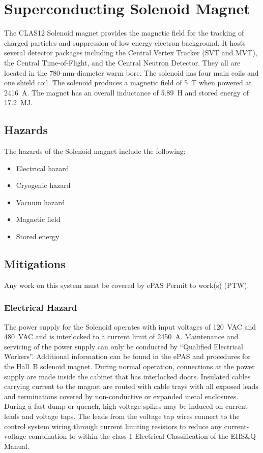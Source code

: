 \section{Superconducting Solenoid Magnet}

The CLAS12 Solenoid magnet provides the magnetic field for the tracking of charged 
particles and suppression of low energy electron background. It hosts several detector 
packages including the Central Vertex Tracker (SVT and MVT), the Central Time-of-Flight, 
and the Central Neutron Detector. They all are located in the 780-mm-diameter warm bore. 
The solenoid has four main coils and one shield coil. The solenoid produces a magnetic 
field of 5~T when powered at 2416~A. The magnet has an overall inductance of 5.89~H and 
stored energy of 17.2~MJ.

\subsection{Hazards} 

The hazards of the Solenoid magnet include the following:

\begin{itemize}
\item Electrical hazard
\item Cryogenic hazard
\item Vacuum hazard
\item Magnetic field
\item Stored energy
\end{itemize}

\subsection{Mitigations}
Any work on this system must be covered by ePAS Permit to work(s) (PTW).

\subsubsection{Electrical Hazard}

The power supply for the Solenoid operates with input voltages of 120~VAC and 480~VAC and 
is interlocked to a current limit of 2450~A. Maintenance and servicing of the power supply 
can only be conducted by ``Qualified Electrical Workers''. Additional information can be 
found in the ePAS and procedures for the Hall~B solenoid magnet. During normal operation, connections at 
the power supply are made inside the cabinet that has interlocked doors. Insulated cables 
carrying current to the magnet are routed with cable trays with all exposed leads and 
terminations covered by non-conductive or expanded metal enclosures. During a fast dump or 
quench, high voltage spikes may be induced on current leads and voltage taps. The leads from
the voltage tap wires connect to the control system wiring through current limiting resistors 
to reduce any current-voltage combination to within the class-1 Electrical Classification of 
the EHS\&Q Manual.

